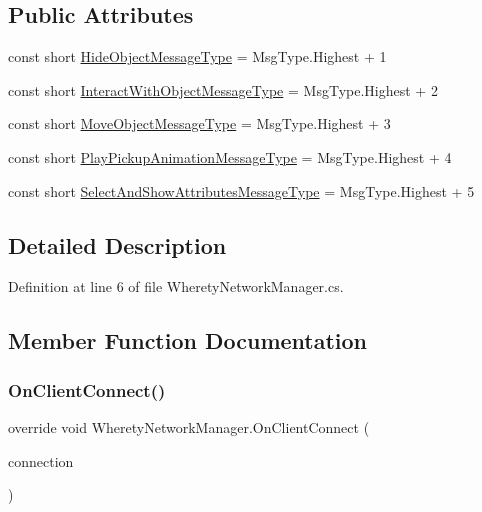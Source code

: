 \subsection*{Public Attributes}
\begin{DoxyCompactItemize}
\item 
const short \mbox{\hyperlink{class_wherety_network_manager_aa5ec96c0e0a247df2a8deef2b48f5d37}{Hide\+Object\+Message\+Type}} = Msg\+Type.\+Highest + 1
\item 
const short \mbox{\hyperlink{class_wherety_network_manager_afc167de4176e136df7e0ea9b148e0051}{Interact\+With\+Object\+Message\+Type}} = Msg\+Type.\+Highest + 2
\item 
const short \mbox{\hyperlink{class_wherety_network_manager_a6d27960bd46c2086472904588aa41dd3}{Move\+Object\+Message\+Type}} = Msg\+Type.\+Highest + 3
\item 
const short \mbox{\hyperlink{class_wherety_network_manager_ae3eb8fd7f71b5d2c6f6bf0189f3deff3}{Play\+Pickup\+Animation\+Message\+Type}} = Msg\+Type.\+Highest + 4
\item 
const short \mbox{\hyperlink{class_wherety_network_manager_a434267823b738ab40c2e56cea748c401}{Select\+And\+Show\+Attributes\+Message\+Type}} = Msg\+Type.\+Highest + 5
\end{DoxyCompactItemize}


\subsection{Detailed Description}


Definition at line 6 of file Wherety\+Network\+Manager.\+cs.



\subsection{Member Function Documentation}
\mbox{\label{class_wherety_network_manager_a6d43d882c74b5a92aa0fd5110de64070}} 
\subsubsection{\texorpdfstring{OnClientConnect()}{OnClientConnect()}}
{\footnotesize\ttfamily override void Wherety\+Network\+Manager.\+On\+Client\+Connect (\begin{DoxyParamCaption}\item[{Network\+Connection}]{connection }\end{DoxyParamCaption})}



